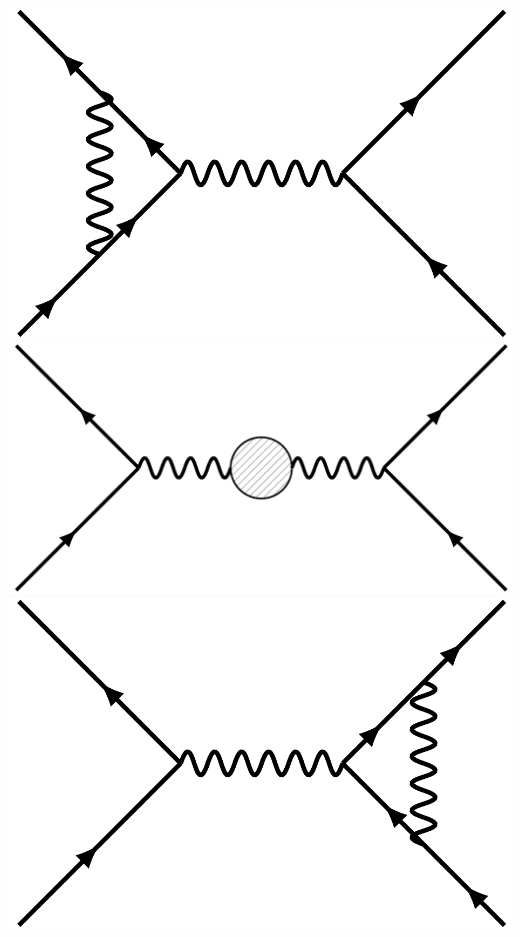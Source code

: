 \documentclass[10pt, pdf, hyperref={unicode}]{beamer}
\begin{document}
\begin{frame}
\begin{minipage}{\linewidth}
\begin{columns}[T]
			\begin{column}{0.3\linewidth}
				\includegraphics[width = 0.8\linewidth]{diagram5.pdf}
				\vspace{10pt}
				\includegraphics[width = 0.8\linewidth]{diagram3.pdf}
				\vspace{10pt}
				\includegraphics[width = 0.8\linewidth]{diagram6.pdf}
			\end{column}


\end{columns}
\end{minipage}
\end{frame}
\end{document}
